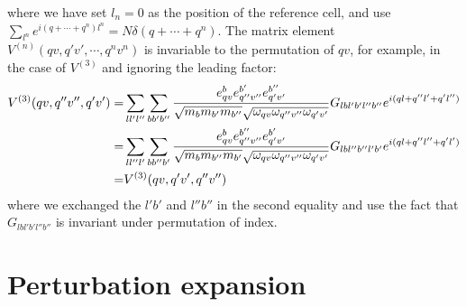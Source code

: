 \documentclass{article}
\begin{document}
where we have set $l_n = 0$ as the position of the reference cell, and use $\sum_{l^n} e^{i(q+\cdots+q^n)l^n} = N \delta(q + \cdots + q^n) $. The matrix element 
$V^{(n)}(qv,q'v',\cdots,q^nv^n)$ is invariable to the permutation of $qv$, for example, in the case of $V^{(3)}$ and ignoring the leading factor:
\begin{align}
    V^{(3)}(qv,q''v'',q'v') = & \sum_{ll'l''} \sum_{bb'b''} 
    \frac{e_{qv}^b e_{q''v''}^{b'} e_{q'v'}^{b''} }{\sqrt{m_b m_{b'} m_{b''}} \sqrt{\omega_{qv}\omega_{q''v''}\omega_{q'v'}}} G_{lbl'b'l''b''} e^{i(ql + q''l' + q'l'')} \notag \\
    = &\sum_{ll''l'} \sum_{bb''b'} 
    \frac{e_{qv}^b e_{q''v''}^{b''} e_{q'v'}^{b'} }{\sqrt{m_b m_{b''} m_{b'}} \sqrt{\omega_{qv}\omega_{q''v''}\omega_{q'v'}}} G_{lbl''b''l'b'} e^{i(ql + q''l'' + q'l')} \notag \\
    = &V^{(3)}(qv,q'v',q''v'')
\end{align}
where we exchanged the $l'b'$ and $l''b''$ in the second equality and use the fact that $G_{lbl'b'l''b''}$ is invariant under permutation of index.

\section{Perturbation expansion}
\end{document}
